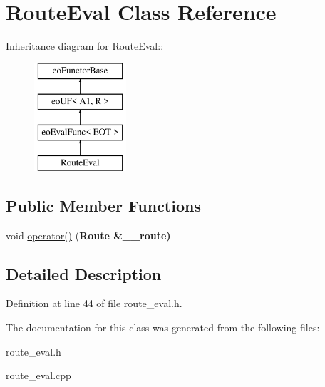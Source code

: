 \hypertarget{classRouteEval}{
\section{Route\-Eval Class Reference}
\label{classRouteEval}
}
Inheritance diagram for Route\-Eval::\begin{figure}[H]
\begin{center}
\leavevmode
\includegraphics[height=4cm]{classRouteEval}
\end{center}
\end{figure}
\subsection*{Public Member Functions}
\begin{CompactItemize}
\item 
\hypertarget{classRouteEval_e10bbe6f792e6f44405953de4f703901}{
void \hyperlink{classRouteEval_e10bbe6f792e6f44405953de4f703901}{operator()} (\bf{Route} \&\_\-\_\-route)}
\label{classRouteEval_e10bbe6f792e6f44405953de4f703901}

\end{CompactItemize}


\subsection{Detailed Description}




Definition at line 44 of file route\_\-eval.h.

The documentation for this class was generated from the following files:\begin{CompactItemize}
\item 
route\_\-eval.h\item 
route\_\-eval.cpp\end{CompactItemize}
